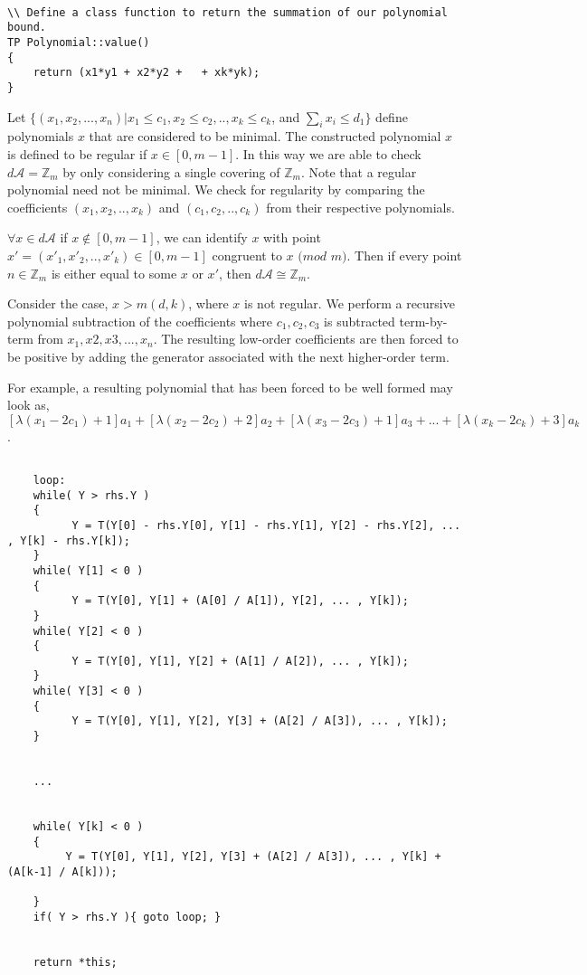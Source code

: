 \begin{lstlisting}

\\ Define a class function to return the summation of our polynomial bound.
TP Polynomial::value()
{
    return (x1*y1 + x2*y2 +   + xk*yk);
}

\end{lstlisting}

\noindent
Let $ \{ (x_{1}, x_{2}, ... , x_{n}) \vert x_{1} \leq c_{1}, x_{2} \leq c_{2}, .. , x_{k} \leq c_{k}$, and $\sum_{i} x_{i} \leq d_{1} \}$ define polynomials $x$ that are considered to be minimal.\n
The constructed polynomial $x$ is defined to be regular if $x \in [0, m-1]$. In this way we are able to check $d \mathcal{A} = \mathbb{Z}_{m}$ by only considering a single covering of $\mathbb{Z}_{m}$.\n
Note that a regular polynomial need not be minimal.\n
We check for regularity by comparing the coefficients $(x_{1}, x_{2}, .. , x_{k})$ and $(c_{1}, c_{2}, .. , c_{k})$ from their respective polynomials.\n

\noindent
$\forall x \in d \mathcal{A}$ if $x \notin [0, m-1]$, we can identify $x$ with point $x' = (x'_{1}, x'_{2}, .. , x'_{k}) \in [0, m-1]$ congruent to $x$ $(mod$ $m)$.  Then if every point $n \in \mathbb{Z}_{m}$ is either equal to some $x$ or $x'$, then $d \mathcal{A} \cong \mathbb{Z}_m$.\n

Consider the case, $x > m(d, k)$, where $x$ is not regular. We perform a recursive polynomial subtraction of the coefficients where $c_{1}, c_{2}, c_{3}$ is subtracted term-by-term from $x_{1}, x{2}, x{3}, ... , x_{n}$. The resulting low-order coefficients are then forced to be positive by adding the generator associated with the next higher-order term.\n

For example, a resulting polynomial that has been forced to be well formed may look as, $[\lambda(x_{1} - 2 c_{1}) + 1]a_{1} + [\lambda(x_{2} - 2 c_{2}) + 2]a_{2} + [\lambda(x_{3} - 2 c_{3}) + 1]a_{3} + ... + [\lambda(x_{k} - 2 c_{k}) + 3]a_{k}$.\n

\begin{lstlisting}

    loop:
    while( Y > rhs.Y )
    {
          Y = T(Y[0] - rhs.Y[0], Y[1] - rhs.Y[1], Y[2] - rhs.Y[2], ... , Y[k] - rhs.Y[k]);
    }
    while( Y[1] < 0 )
    {
          Y = T(Y[0], Y[1] + (A[0] / A[1]), Y[2], ... , Y[k]);
    }
    while( Y[2] < 0 )
    {
          Y = T(Y[0], Y[1], Y[2] + (A[1] / A[2]), ... , Y[k]);
    }
    while( Y[3] < 0 )
    {
          Y = T(Y[0], Y[1], Y[2], Y[3] + (A[2] / A[3]), ... , Y[k]);
    }


    ...


    while( Y[k] < 0 )
    {
         Y = T(Y[0], Y[1], Y[2], Y[3] + (A[2] / A[3]), ... , Y[k] + (A[k-1] / A[k]));

    }
    if( Y > rhs.Y ){ goto loop; } 


    return *this;

\end{lstlisting}



